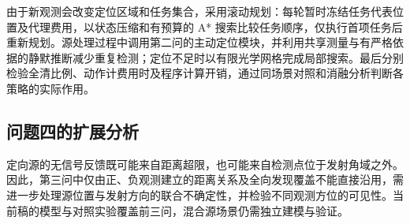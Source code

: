 由于新观测会改变定位区域和任务集合，采用滚动规划：每轮暂时冻结任务代表位置及代理费用，以状态压缩和有预算的 A* 搜索比较任务顺序，仅执行首项任务后重新规划。源处理过程中调用第二问的主动定位模块，并利用共享测量与有严格依据的静默推断减少重复检测；定位不足时以有限光学网格完成局部搜索。最后分别检验全清比例、动作计费用时及程序计算开销，通过同场景对照和消融分析判断各策略的实际作用。

\subsection{问题四的扩展分析}

定向源的无信号反馈既可能来自距离超限，也可能来自检测点位于发射角域之外。因此，第三问中仅由正、负观测建立的距离关系及全向发现覆盖不能直接沿用，需进一步处理源位置与发射方向的联合不确定性，并检验不同观测方位的可见性。当前稿的模型与对照实验覆盖前三问，混合源场景仍需独立建模与验证。

